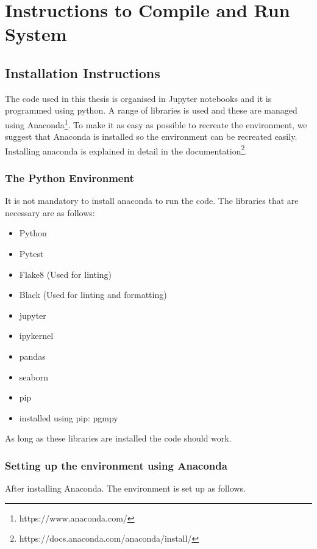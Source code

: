 \chapter{Instructions to Compile and Run System}
\label{apx:instructions}

\section{Installation Instructions}

The code used in this thesis is organised in Jupyter notebooks and it is programmed using python. A range of libraries is used and these are managed using Anaconda\footnote{https://www.anaconda.com/}. To make it as easy as possible to recreate the environment, we suggest that Anaconda is installed so the environment can be recreated easily. Installing anaconda is explained in detail in the documentation\footnote{https://docs.anaconda.com/anaconda/install/}.

\subsection{The Python Environment}

It is not mandatory to install anaconda to run the code. The libraries that are necessary are as follows:

\begin{itemize}
    \item Python
    \item Pytest
    \item Flake8 (Used for linting)
    \item Black (Used for linting and formatting)
    \item jupyter
    \item ipykernel
    \item pandas
    \item seaborn
    \item pip
    \item installed using pip: pgmpy
\end{itemize}

As long as these libraries are installed the code should work. 

\subsection{Setting up the environment using Anaconda}

After installing Anaconda. The environment is set up as follows. 


